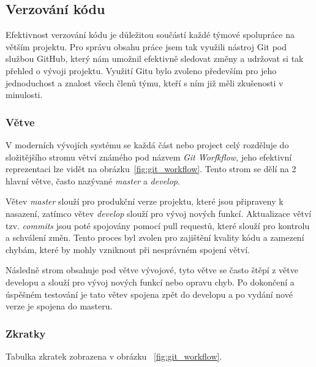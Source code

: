 \subsection{Verzování kódu}
\label{subsec:implementation-collaboration-versioning}
Efektivnost verzování kódu je důležitou součástí každé týmové spolupráce na větším projektu. Pro správu obsahu práce jsem tak využili nástroj Git pod službou GitHub, který nám umožnil efektivně sledovat změny a udržovat si tak přehled o vývoji projektu. Využití Gitu bylo zvoleno především pro jeho jednoduchost a znalost všech členů týmu, kteří s ním již měli zkušenosti v minulosti.


\subsubsection*{Větve}
\label{subsubsec:implementation-collaboration-versioning-branches}
V moderních vývojích systému se každá část nebo project celý rozděluje do složitějšího stromu větví známého pod názvem \textit{Git Worfkflow}, jeho efektivní reprezentaci lze vidět na obrázku~\ref{fig:git_workflow}. Tento strom se dělí na 2 hlavní větve, často nazývané \textit{master} a \textit{develop}.

Větev \textit{master} slouží pro produkční verze projektu, které jsou připraveny k nasazení, zatímco větev \textit{develop} slouží pro vývoj nových funkcí. Aktualizace větví tzv. \textit{commits} jsou poté spojovány pomocí pull requestů, které slouží pro kontrolu a schválení změn. Tento proces byl zvolen pro zajištění kvality kódu a zamezení chybám, které by mohly vzniknout při nesprávném spojení větví.

Následně strom obsahuje pod větve vývojové, tyto větve se často štěpí z větve developu a slouží pro vývoj nových funkcí nebo opravu chyb. Po dokončení a úspěšném testování je tato větev spojena zpět do developu a po vydání nové verze je spojena do masteru.

\subsubsection*{Zkratky}
Tabulka zkratek zobrazena v obrázku ~\ref{fig:git_workflow}.

